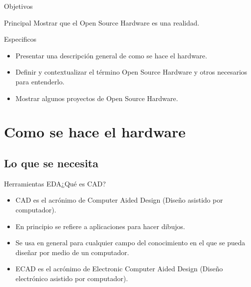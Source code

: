 \documentclass{beamer}
\begin{document}
\begin{frame}{Objetivos}
  \begin{block}{Principal}
    Mostrar que el Open Source Hardware es una realidad.
  \end{block}
  \begin{block}{Especificos}
    \begin{itemize}
    \item Presentar una descripción general de como se hace el hardware.
    \item Definir y contextualizar el término Open Source Hardware y otros necesarios para entenderlo.
    \item Mostrar algunos proyectos de Open Source Hardware.
    \end{itemize}
  \end{block}
\end{frame}


\section{Como se hace el hardware}

\subsection{Lo que se necesita}

\begin{frame}{Herramientas EDA}{¿Qué es CAD?}
  \begin{itemize}
  \item CAD es el acrónimo de Computer Aided Design (Diseño asistido por computador).
  \item En principio se refiere a aplicaciones para hacer dibujos.
  \item Se usa en general para cualquier campo del conocimiento en el que se pueda diseñar por medio de un computador.
  \item ECAD es el acrónimo de Electronic Computer Aided Design (Diseño electrónico asistido por computador).
  \end{itemize}
\end{frame}
\end{document}
